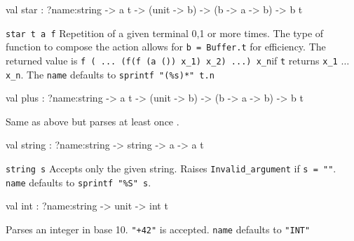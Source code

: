 \documentclass[11pt]{article}
\begin{document}
\label{val:Lex.star}\begin{ocamldoccode}
val star : ?name:string -> {\textquotesingle}a t -> (unit -> {\textquotesingle}b) -> ({\textquotesingle}b -> {\textquotesingle}a -> {\textquotesingle}b) -> {\textquotesingle}b t
\end{ocamldoccode}
\begin{ocamldocdescription}
{\tt{star t a f}} Repetition of a given terminal 0,1 or more times.
    The type of function to compose the action allows for {\tt{{\textquotesingle}b = Buffer.t}}
    for efficiency. The returned value is
    {\tt{f ( ... (f(f (a ()) x\_1) x\_2) ...) x\_n}}if {\tt{t}} returns {\tt{x\_1}} $\ldots$ {\tt{x\_n}}.
    The {\tt{name}} defaults to {\tt{sprintf "(\%s)*" t.n}}


\end{ocamldocdescription}




\label{val:Lex.plus}\begin{ocamldoccode}
val plus : ?name:string -> {\textquotesingle}a t -> (unit -> {\textquotesingle}b) -> ({\textquotesingle}b -> {\textquotesingle}a -> {\textquotesingle}b) -> {\textquotesingle}b t
\end{ocamldoccode}
\begin{ocamldocdescription}
Same as above but parses at least once .


\end{ocamldocdescription}




\label{val:Lex.string}\begin{ocamldoccode}
val string : ?name:string -> string -> {\textquotesingle}a -> {\textquotesingle}a t
\end{ocamldoccode}
\begin{ocamldocdescription}
{\tt{string s}} Accepts only the given string.
    Raises {\tt{Invalid\_argument}} if {\tt{s = ""}}.
    {\tt{name}} defaults to {\tt{sprintf "\%S" s}}.


\end{ocamldocdescription}




\label{val:Lex.int}\begin{ocamldoccode}
val int : ?name:string -> unit -> int t
\end{ocamldoccode}
\begin{ocamldocdescription}
Parses an integer in base 10. {\tt{"+42"}} is accepted.
    {\tt{name}} defaults to {\tt{"INT"}}


\end{ocamldocdescription}
\end{document}

